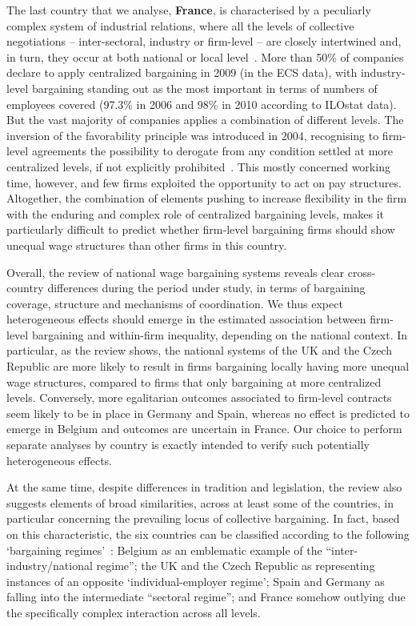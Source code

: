 \documentclass[12pt]{article}
\begin{document}
The last country that we analyse, \textbf{France}, is characterised by a peculiarly complex system of industrial relations, where all the levels of collective negotiations -- inter-sectoral, industry or firm-level -- are closely intertwined and, in turn, they occur at both national or local level~\citep{fulton.2013,fulton.2015}.
More than 50\% of companies declare to apply centralized bargaining in 2009 (in the ECS data), with industry-level bargaining standing out as the most important in terms of numbers of employees covered (97.3\% in 2006 and 98\% in 2010 according to ILOstat data). But the vast majority of companies applies a combination of different levels.
The inversion of the favorability principle was introduced in 2004, recognising to firm-level agreements the possibility to derogate from any condition settled at more centralized levels, if not explicitly prohibited~\citep{keune2011decentralizing}.
This mostly concerned working time, however, and few firms exploited the opportunity to act on pay structures. Altogether, the combination of elements pushing to increase flexibility in the firm with the enduring and complex role of centralized bargaining levels, makes it particularly difficult to predict whether firm-level bargaining firms should show unequal wage structures than other firms in this country.

Overall, the review of national wage bargaining systems reveals clear cross-country differences during the period under study, in terms of bargaining coverage, structure and mechanisms of coordination. We thus expect heterogeneous effects should emerge in the estimated association between firm-level bargaining and within-firm inequality, depending on the national context. In particular, as the review shows, the national systems of the UK and the Czech Republic are more likely to result in firms bargaining locally having more unequal wage structures, compared to firms that only bargaining at more centralized levels. Conversely, more egalitarian outcomes associated to firm-level contracts seem likely to be in place in Germany and Spain, whereas no effect is predicted to emerge in Belgium and outcomes are uncertain in France. Our choice to perform separate analyses by country is exactly intended to verify such potentially heterogeneous effects.

At the same time, despite differences in tradition and legislation, the review also suggests elements of broad similarities, across at least some of the countries, in particular concerning the prevailing locus of collective bargaining. In fact, based on this characteristic, the six countries can be classified according to the following ‘bargaining regimes’~\citep[see][]{fulton.2013}: Belgium as an emblematic example of the “inter-industry/national regime”; the UK and the Czech Republic as representing instances of an opposite ‘individual-employer regime’; Spain and Germany as falling into the intermediate “sectoral regime”; and France somehow outlying due the specifically complex interaction across all levels.
\end{document}
